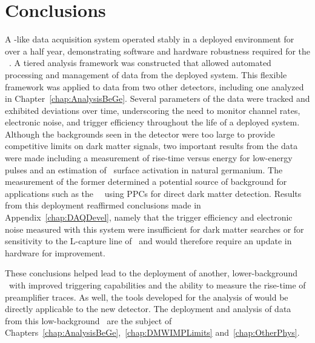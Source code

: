 	\section{Conclusions}
	
	A \MJ-like data acquisition system operated stably in a deployed
environment for over a half year, demonstrating software and hardware
robustness required for the \MJ~\minmod.  A tiered analysis framework was
constructed that allowed automated processing and management of data from the
deployed system.  This flexible framework was applied to data from two other
detectors, including one analyzed in Chapter~\ref{chap:AnalysisBeGe}.  Several
parameters of the data were tracked and exhibited deviations over time,
underscoring the need to monitor channel rates, electronic noise, and trigger
efficiency throughout the life of a deployed system.  Although the backgrounds
seen in the detector were too large to provide competitive limits on dark
matter signals, two important results from the data were made including a
measurement of rise-time versus energy for low-energy pulses and an estimation
of \gersixeight~surface activation in natural germanium.  The measurement of
the former determined a potential source of background for applications such as
the \MJ~\minmod~using PPCs for direct dark matter detection.  Results from this
deployment reaffirmed conclusions made in Appendix~\ref{chap:DAQDevel}, namely
that the trigger efficiency and electronic noise measured with this system were
insufficient for dark matter searches or for sensitivity to the L-capture line
of \gersixeight~and would therefore require an update in hardware for improvement.

These conclusions helped lead to the deployment of another, lower-background \ppc~with
improved triggering capabilities and the ability to measure the rise-time of 
preamplifier traces.  As well, the tools developed for the analysis of  would
be directly applicable to the new detector.  The deployment and analysis of data
from this low-background \ppc~are the subject of Chapters~\ref{chap:AnalysisBeGe},~\ref{chap:DMWIMPLimits} and~\ref{chap:OtherPhys}.
